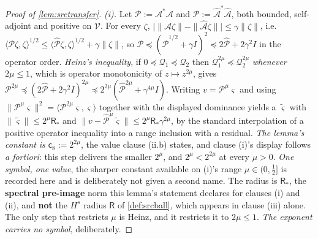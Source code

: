 \begin{proof}[Proof of \cref{lem:srctransfer}]
\emph{(i).} Let $\mathcal P:=\mathcal A^\ast\mathcal A$ and $\hat{\mathcal P}:=\hat{\mathcal A}^\ast\hat{\mathcal A}$,
both bounded, self-adjoint and positive on $\mathcal V$. For every $\zeta$,
$\big|\|\mathcal A\zeta\|-\|\hat{\mathcal A}\zeta\|\big|\le\gamma\|\zeta\|$, i.e.
$\langle\mathcal P\zeta,\zeta\rangle^{1/2}\le\langle\hat{\mathcal P}\zeta,\zeta\rangle^{1/2}+\gamma\|\zeta\|$,
so $\mathcal P\preceq(\hat{\mathcal P}^{1/2}+\gamma I)^{2}\preceq2\hat{\mathcal P}+2\gamma^{2}I$ in the
operator order. \emph{Heinz's inequality}, if $0\preceq\mathcal Q_1\preceq\mathcal Q_2$ then
$\mathcal Q_1^{2\mu}\preceq\mathcal Q_2^{2\mu}$ \emph{whenever $2\mu\le1$}, which is operator
monotonicity of $z\mapsto z^{2\mu}$, gives
$\mathcal P^{2\mu}\preceq(2\hat{\mathcal P}+2\gamma^{2}I)^{2\mu}
\preceq2^{2\mu}(\hat{\mathcal P}^{2\mu}+\gamma^{4\mu}I)$. Writing
$v=\mathcal P^{\mu}\varsigma$ and using
$\|\mathcal P^{\mu}\varsigma\|^{2}=\langle\mathcal P^{2\mu}\varsigma,\varsigma\rangle$ together with the
displayed dominance yields a $\tilde\varsigma$ with $\|\tilde\varsigma\|\le2^{\mu}\mathsf R_\ast$ and
$\|v-\hat{\mathcal P}^{\mu}\tilde\varsigma\|\le2^{\mu}\mathsf R_\ast\gamma^{2\mu}$, by the
standard interpolation of a positive operator inequality into a range inclusion with a residual.
\emph{The lemma's constant is $\mathsf c_8:=2^{2\mu}$}, the value clause \textup{(ii.b)} states, and
clause \textup{(i)}'s display follows \emph{a fortiori}: this step delivers the smaller $2^{\mu}$, and
$2^{\mu}<2^{2\mu}$ at every $\mu>0$. \emph{One symbol, one value}, the sharper constant available on
(i)'s range $\mu\in(0,\tfrac12]$ is recorded here and is deliberately not given a second name.
The radius is $\mathsf R_\ast$, the \textbf{spectral pre-image} norm this
lemma's statement declares for clauses \textup{(i)} and \textup{(ii)}, and \textbf{not} the $H^{s}$
radius $\mathsf R$ of \cref{def:srcball}, which appears in clause \textup{(iii)} alone.
The only step that restricts $\mu$ is Heinz, and it restricts it to
$2\mu\le1$. \emph{The exponent carries no symbol}, deliberately.


\end{proof}
